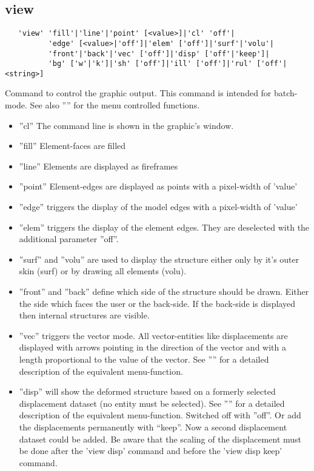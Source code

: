 \documentclass{article}
\begin{document}
\subsection{\label{view}view}
\begin{verbatim}
   'view' 'fill'|'line'|'point' [<value>]|'cl' 'off'|
          'edge' [<value>|'off']|'elem' ['off']|'surf'|'volu'|
          'front'|'back'|'vec' ['off']|'disp' ['off'|'keep']|
          'bg' ['w'|'k']|'sh' ['off']|'ill' ['off']|'rul' ['off'|<string>]
\end{verbatim}
Command to control the graphic output. This command is intended for batch-mode. See also '''' for the menu controlled functions.
\begin{itemize}
\item ''cl'' The command line is shown in the graphic's window. 
\item ''fill'' Element-faces are filled 
\item ''line'' Elements are displayed as fireframes
\item ''point'' Element-edges are displayed as points with a pixel-width of 'value'
\item ''edge'' triggers the display of the model edges with a pixel-width of 'value'
\item ''elem'' triggers the display of the element edges. They are deselected with the additional parameter ''off''.
\item ''surf'' and ''volu'' are used to display the structure either only by it's outer skin (surf) or by drawing all elements (volu). \item ''front'' and ''back'' define which side of the structure should be drawn. Either the side which faces the user or the back-side. If the back-side is displayed then internal structures are visible. 
\item ''vec'' triggers the vector mode. All vector-entities like displacements are displayed with arrows pointing in the direction of the vector and with a length proportional to the value of the vector. See '''' for a detailed description of the equivalent menu-function.
\item ''disp'' will show the deformed structure based on a formerly selected displacement dataset (no entity must be selected). See '''' for a detailed description of the equivalent menu-function. Switched off with ”off”. Or add the displacements permanently with ``keep''. Now a second displacement dataset could be added. Be aware that the scaling of the displacement must be done after the 'view disp' command and before the 'view disp keep' command.

\end{itemize}
\end{document}
